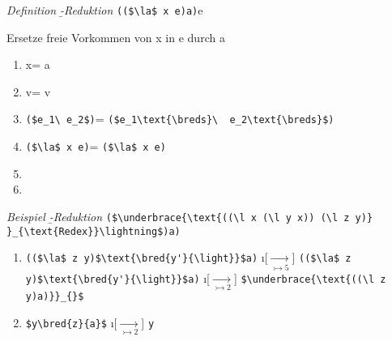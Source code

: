 \emph{Definition \b-Reduktion} \lstinline[mathescape]|(($\la$ x e)a)|\beval e\breds \hfil \parbox{5cm}{\glqq Ersetze freie Vorkommen von x in e durch a\grqq}
\begin{enumerate}[($\rightarrowtail 1$)]
\item x\breds = a
\item v\breds = v
\item \lstinline[mathescape]|($e_1\ e_2$)|\breds = \lstinline[mathescape]|($e_1\text{\breds}\  e_2\text{\breds}$)|
\item \lstinline[mathescape]|($\la$ x e)|\breds = \lstinline[mathescape]|($\la$ x e)|
\item {}
\item
\end{enumerate}
\emph{Beispiel \b-Reduktion}
\lstinline[mathescape]|($\underbrace{\text{((\l x (\l y x)) (\l z y)} }_{\text{Redex}}\lightning$)a)|
\begin{enumerate}[\beval]
\i \lstinline[mathescape]|((($\la$ y x)$\text{\bred{x}{(\l z y)}})\lightning
$)a)|
\i[$\underset{\rightarrowtail 6}{\rightarrow}$] \lstinline[mathescape]|((($\text{\l y' x \bred{y}{y'})\bred{x}{(\l z y)}}\lightning)$a)|
\i[$\underset{\rightarrowtail 2}{\rightarrow}$] \lstinline[mathescape]|((($\text{\l y' x )\bred{x}{(\l z y)}}\lightning)$a)|
\i[$\underset{\rightarrowtail 5}{\rightarrow}$] \lstinline[mathescape]|((($\text{\l y' x \bred{x}{(\l z y)}})\lightning)$a)|
\i[$\underset{\rightarrowtail 1}{\rightarrow}$] \lstinline[mathescape]|($\underbrace{\text{((\l y'(\l z y))}\lightning)}_{\text{Redex}}$a)|
\item \lstinline[mathescape]|(($\la$ z y)$\text{\bred{y'}{\light}}$a)|
\i[$\underset{\rightarrowtail 5}{\rightarrow}$] \lstinline[mathescape]|(($\la$ z y)$\text{\bred{y'}{\light}}$a)|
\i[$\underset{\rightarrowtail 2}{\rightarrow}$] \lstinline[mathescape]|$\underbrace{\text{((\l z y)a)}}_{}$|
\item \lstinline[mathescape]|$y\bred{z}{a}$|
\i[$\underset{\rightarrowtail 2}{\rightarrow}$] \lstinline|y|
\end{enumerate}
